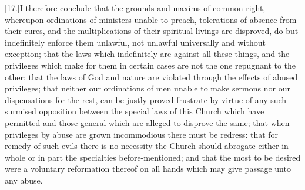 [17.]I therefore conclude that the grounds and maxims of common right, whereupon ordinations of ministers unable to preach, tolerations of absence from their cures, and the multiplications of their spiritual livings are disproved, do but indefinitely enforce them unlawful, not unlawful universally and without exception; that the laws which indefinitely are against all these things, and the privileges which make for them in certain cases are not the one repugnant to the other; that the laws of God and nature are violated through the effects of abused privileges; that neither our ordinations of men unable to make sermons nor our dispensations for the rest, can be justly proved frustrate by virtue of any such surmised opposition between the special laws of this Church which have permitted and those general which are alleged to disprove the same; that when privileges by abuse are grown incommodious there must be redress: that for remedy of such evils there is no necessity the Church should abrogate either in whole or in part the specialties before-mentioned; and that the most to be desired were a voluntary reformation thereof on all hands which may give passage unto any abuse.







